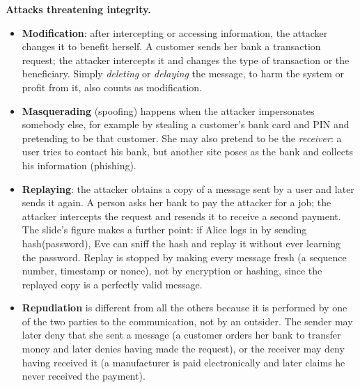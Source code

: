 \textbf{Attacks threatening integrity.}
\begin{itemize}[leftmargin=1.4em]
  \item \textbf{Modification}: after intercepting or accessing information, the attacker changes it to benefit herself. A customer sends her bank a transaction request; the attacker intercepts it and changes the type of transaction or the beneficiary. Simply \emph{deleting} or \emph{delaying} the message, to harm the system or profit from it, also counts as modification.
  \item \textbf{Masquerading} (spoofing) happens when the attacker impersonates somebody else, for example by stealing a customer's bank card and PIN and pretending to be that customer. She may also pretend to be the \emph{receiver}: a user tries to contact his bank, but another site poses as the bank and collects his information (phishing).
  \item \textbf{Replaying}: the attacker obtains a copy of a message sent by a user and later sends it again. A person asks her bank to pay the attacker for a job; the attacker intercepts the request and resends it to receive a second payment. The slide's figure makes a further point: if Alice logs in by sending hash(password), Eve can sniff the hash and replay it without ever learning the password. Replay is stopped by making every message fresh (a sequence number, timestamp or nonce), not by encryption or hashing, since the replayed copy is a perfectly valid message.
  \item \textbf{Repudiation} is different from all the others because it is performed by one of the two parties to the communication, not by an outsider. The sender may later deny that she sent a message (a customer orders her bank to transfer money and later denies having made the request), or the receiver may deny having received it (a manufacturer is paid electronically and later claims he never received the payment).
\end{itemize}

